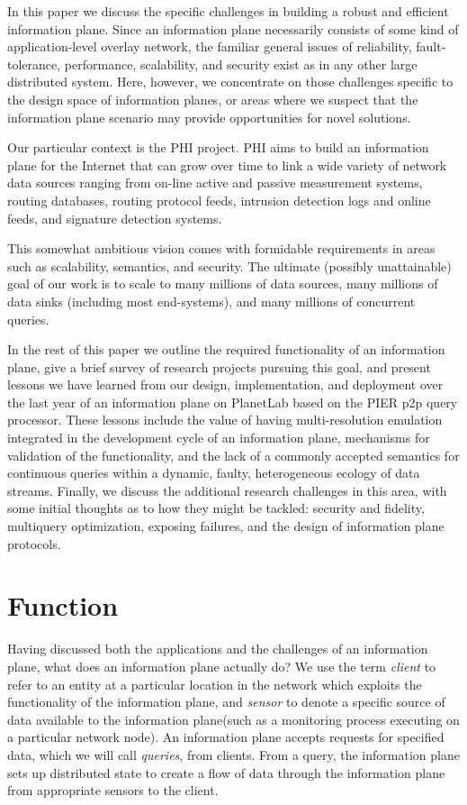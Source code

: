 \documentclass[10pt,twocolumn]{MyTightStyle}
\def\IP{information plane\xspace}
\def\PHI{PHI\xspace}
\begin{document}
In this paper we discuss the specific challenges in building a
robust and efficient \IP.  Since an \IP necessarily consists of some
kind of application-level overlay network, the familiar general
issues of reliability, fault-tolerance, performance, scalability,
and security exist as in any other large distributed system. 
Here, however, we concentrate on those challenges specific to the
design space of information planes, or areas where we suspect that the
information plane scenario may provide opportunities for novel
solutions. 

Our particular context is the \PHI project. \PHI aims to build an
information plane for the Internet that can grow over time to link a 
wide variety of network data sources ranging from on-line active and
passive measurement systems, routing databases, routing protocol
feeds, intrusion detection logs and online feeds, and signature
detection systems.  

This somewhat ambitious vision comes with formidable requirements in
areas such as scalability, semantics, and security.  The ultimate
(possibly unattainable) goal of our work is to scale to many millions
of data sources, many millions of data sinks (including most
end-systems), and many millions of concurrent queries.  

In the rest of this paper we outline the required functionality of an
information plane, give a brief survey of research projects pursuing
this goal, and present lessons we have learned from our design,
implementation, and deployment over the last year of an \IP
on PlanetLab based on the PIER p2p query processor.  These lessons
include the value of having multi-resolution emulation integrated in
the development cycle of an information plane, mechanisms for
validation of the functionality, and the lack of a commonly accepted
semantics for continuous queries within a dynamic, faulty,
heterogeneous ecology of data streams.  Finally, we discuss the
additional research challenges in this area, with some initial
thoughts as to how they might be tackled: security and fidelity,
multiquery optimization, exposing failures, and the design of \IP
protocols. 

\section{Function}
\label{sec:function}

Having discussed both the applications and the challenges of an \IP,
what does an \IP actually do?   We 
use the term \emph{client} to refer to an entity at a particular
location in the network which exploits the functionality of the \IP,
and \emph{sensor} to denote a specific source of data available to the
\IP (such as a monitoring process executing on a particular network
node).  
An \IP accepts requests for specified data, which we will call
\emph{queries}, from clients.  From a query, the \IP sets up
distributed state to create a flow of data through the \IP from
appropriate sensors to the client.  
\end{document}
